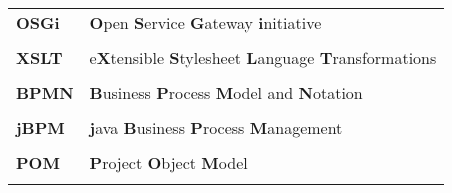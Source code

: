 \documentclass[a4paper, 12pt, oneside]{Thesis}  %
\begin{document}
\begin{table}[!h]
\begin{tabular}{ll}
	\textbf{OSGi}	& \textbf{O}pen \textbf{S}ervice  \textbf{G}ateway \textbf{i}nitiative	 \\ \\
	\textbf{XSLT}	& e\textbf{X}tensible \textbf{S}tylesheet  \textbf{L}anguage \textbf{T}ransformations	 \\ \\
	\textbf{BPMN}	& \textbf{B}usiness \textbf{P}rocess  \textbf{M}odel and \textbf{N}otation	 \\ \\
	\textbf{jBPM}	& \textbf{j}ava  \textbf{B}usiness \textbf{P}rocess \textbf{M}anagement	
 \\ \\
	\textbf{POM}	& \textbf{P}roject \textbf{O}bject  \textbf{M}odel  \\ \\
\end{tabular}
\end{table}






\pagestyle{empty}  %




\mainmatter	  %
\lhead[\rm\thepage]{\fancyplain{}{\sl{\rightmark}}}
\pagestyle{fancy}  %



 

 



 

 

 
\end{document}
